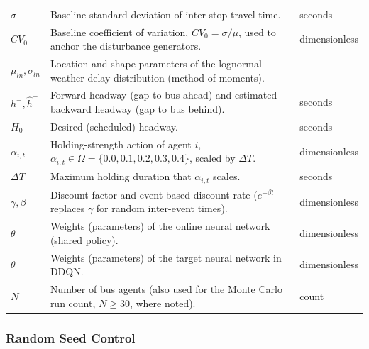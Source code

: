 \begin{table}[htbp]
\begin{tabularx}{\textwidth}{
>{\RaggedRight\arraybackslash}p{}
>{\RaggedRight\arraybackslash}X
>{\RaggedRight\arraybackslash}p{}
}
$\sigma$ &
Baseline standard deviation of inter-stop travel time. &
seconds \\

$CV_0$ &
Baseline coefficient of variation, $CV_0=\sigma/\mu$, used to anchor the disturbance generators. &
dimensionless \\

$\mu_{ln},\sigma_{ln}$ &
Location and shape parameters of the lognormal weather-delay distribution (method-of-moments). &
--- \\

$h^-,\hat{h}^+$ &
Forward headway (gap to bus ahead) and estimated backward headway (gap to bus behind). &
seconds \\

$H_0$ &
Desired (scheduled) headway. &
seconds \\

$\alpha_{i,t}$ &
Holding-strength action of agent $i$, $\alpha_{i,t}\in\Omega=\{0.0,0.1,0.2,0.3,0.4\}$, scaled by $\Delta T$. &
dimensionless \\

$\Delta T$ &
Maximum holding duration that $\alpha_{i,t}$ scales. &
seconds \\

$\gamma,\beta$ &
Discount factor and event-based discount rate ($e^{-\beta t}$ replaces $\gamma$ for random inter-event times). &
dimensionless \\

$\theta$ &
Weights (parameters) of the online neural network (shared policy). &
dimensionless \\

$\theta^-$ &
Weights (parameters) of the target neural network in DDQN. &
dimensionless \\

$N$ &
Number of bus agents (also used for the Monte Carlo run count, $N\geq30$, where noted). &
count \\

\bottomrule
\end{tabularx}
\end{table}

\subsubsection{Random Seed Control}

